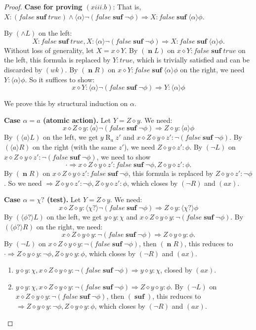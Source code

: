 \documentclass[manuscript,screen]{acmart}
\newcommand{\la}[0]{\langle}
\newcommand{\ra}[0]{\rangle}
\newcommand{\true}[0]{\mathit{true}}
\newcommand{\false}[0]{\mathit{false}}
\newcommand{\cat}[0]{\diamond}
\DeclareMathOperator{\osuf}{\mathbf{suf}}
\DeclareMathOperator{\R}{R}
\DeclareMathOperator{\nxt}{\mathbf{n}}
\begin{document}
\begin{proof}
\textbf{Case for proving $(xiii.b)$}: 
That is, $X : (\false\osuf\true)\wedge \la\alpha\ra\neg(\false\osuf\neg\phi)\Rightarrow X : \false\osuf\la\alpha\ra\phi$.

By $(\wedge L)$ on the left:
$$
X : \false\osuf\true, X : \la\alpha\ra\neg(\false\osuf\neg\phi)\Rightarrow X : \false\osuf\la\alpha\ra\phi. 
$$
Without loss of generality, let $X = x\cat Y$. By $(\nxt L)$ on $x\cat Y : \false\osuf\true$ on the left, this formula is replaced by $Y : \true$, which is trivially satisfied and can be discarded by $(wk)$. By $(\nxt R)$ on $x\cat Y : \false\osuf\la\alpha\ra\phi$ on the right, we need $Y : \la\alpha\ra\phi$. So it suffices to show:
$$
x\cat Y : \la\alpha\ra\neg(\false\osuf\neg\phi)\Rightarrow Y : \la\alpha\ra\phi
$$

We prove this by structural induction on $\alpha$.

\textbf{Case $\alpha = a$ (atomic action).} Let $Y = Z\cat y$. We need:
$$
x\cat Z\cat y : \la a\ra\neg(\false\osuf\neg\phi)\Rightarrow Z\cat y : \la a\ra\phi
$$
By $(\la a\ra L)$ on the left, we get $y\R_a z'$ and $x\cat Z\cat y\cat z' : \neg(\false\osuf\neg\phi)$. By $(\la a\ra R)$ on the right (with the same $z'$), we need $Z\cat y\cat z' : \phi$. By $(\neg L)$ on $x\cat Z\cat y\cat z' : \neg(\false\osuf\neg\phi)$, we need to show $$\cdot\Rightarrow x\cat Z\cat y\cat z' : \false\osuf\neg\phi, Z\cat y\cat z' : \phi.$$ By $(\nxt R)$ on $x\cat Z\cat y\cat z' : \false\osuf\neg\phi$, this formula is replaced by $Z\cat y\cat z' : \neg\phi$. So we need $\Rightarrow Z\cat y\cat z' : \neg\phi, Z\cat y\cat z' : \phi$, which closes by $(\neg R)$ and $(\textit{ax})$.

\textbf{Case $\alpha = \chi?$ (test).} Let $Y = Z\cat y$. We need:
$$
x\cat Z\cat y : \la\chi?\ra\neg(\false\osuf\neg\phi)\Rightarrow Z\cat y : \la\chi?\ra\phi
$$
By $(\la\phi?\ra L)$ on the left, we get $y\cat y : \chi$ and $x\cat Z\cat y\cat y : \neg(\false\osuf\neg\phi)$. By $(\la\phi?\ra R)$ on the right, we need:
$$
x\cat Z\cat y\cat y : \neg(\false\osuf\neg\phi)\Rightarrow Z\cat y\cat y : \phi. 
$$
By $(\neg L)$ on $x\cat Z\cat y\cat y : \neg(\false\osuf\neg\phi)$, then $(\nxt R)$, this reduces to $\cdot\Rightarrow Z\cat y\cat y : \neg\phi, Z\cat y\cat y : \phi$, which closes by $(\neg R)$ and $(\textit{ax})$.

\ifx
\begin{enumerate}
    \item[(xiii.b.$\chi?$.1)] $y\cat y : \chi, x\cat Z\cat y\cat y : \neg(\false\osuf\neg\phi)\Rightarrow y\cat y : \chi$, closed by $(\textit{ax})$.
    \item[(xiii.b.$\chi?$.2)] $y\cat y : \chi, x\cat Z\cat y\cat y : \neg(\false\osuf\neg\phi)\Rightarrow Z\cat y\cat y : \phi$. By $(\neg L)$ on $x\cat Z\cat y\cat y : \neg(\false\osuf\neg\phi)$, then $(\osuf)$, this reduces to $\Rightarrow Z\cat y\cat y : \neg\phi, Z\cat y\cat y : \phi$, which closes by $(\neg R)$ and $(\textit{ax})$.
\end{enumerate}
\fi


\end{proof}
\end{document}

